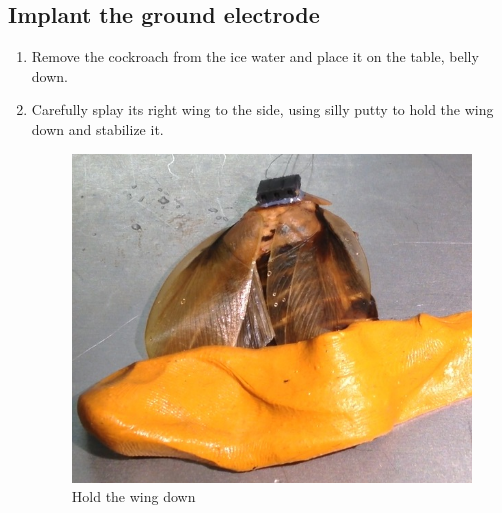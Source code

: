 \subsection{Implant the ground electrode}
\begin{enumerate}
\item Remove the cockroach from the ice water and place it on the table, belly down.
\item Carefully splay its right wing to the side, using silly putty to hold the wing down and stabilize it.
\begin{figure}[ht!]
\centering
\includegraphics[scale=0.25]{Surgery Photos/putty.jpg}
\caption{Hold the wing down}
\label{fig:putty}
\end{figure}


\end{enumerate}
